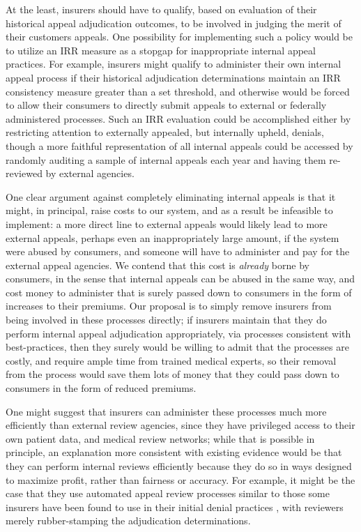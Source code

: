 \documentclass[12pt, a4paper,twoside,parskip=full]{report}
\theoremstyle{plain} %
\theoremstyle{definition} %
\theoremstyle{remark} %
\numberwithin{equation}{chapter}
\begin{document}
		 At the least, insurers should have to qualify, based on evaluation of their historical
		appeal adjudication outcomes, to be involved in judging the merit of their customers appeals. One possibility for implementing such a policy would be to utilize an IRR measure as a stopgap for inappropriate internal appeal practices. For example, insurers might qualify to administer their own internal appeal process if their historical adjudication determinations maintain an IRR consistency measure greater than a set threshold, and otherwise would be forced to allow their consumers to directly submit appeals to external or federally administered processes. Such an IRR evaluation could
		be accomplished either by restricting attention to externally appealed, but internally upheld, denials,
		though a more faithful representation of all internal appeals could be accessed by randomly auditing
		a sample of internal appeals each year and having them re-reviewed by external agencies.
		
		One clear argument against completely eliminating internal appeals is that it might, in principal, raise costs to our system, and as a result be infeasible to implement: a more direct line to external appeals would likely lead to more external appeals, perhaps even an inappropriately large amount, if the system were abused by consumers, and someone will have to administer and pay for the external appeal agencies. We contend that this cost is \emph{already} borne by consumers, in the sense that internal appeals can be abused in the same way, and cost money to administer that is surely passed down to consumers in the form of increases to their premiums. Our proposal is to simply remove insurers from being involved in these processes directly; if insurers maintain that they do perform internal appeal adjudication appropriately, via processes consistent with best-practices, then they surely would be willing to admit that the processes are costly, and require ample time from trained medical experts, so their removal from the process would save them lots of money that they could pass down to consumers in the form of reduced premiums.
		
		One might suggest that insurers can administer these processes much more efficiently than external review agencies, since they have privileged access to their own patient data, and medical review networks; while that is possible in principle, an explanation more consistent with existing evidence would be that they can perform internal reviews efficiently because they do so in ways designed to maximize profit, rather than fairness or accuracy. For example, it might be the case that they use automated appeal review processes similar to those some insurers have been found to use in their initial denial practices \cite{armstrong2023a}, with reviewers merely rubber-stamping the adjudication determinations.
		
\end{document}
